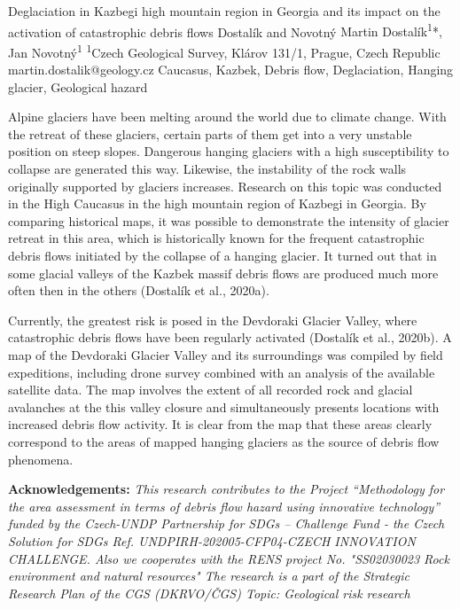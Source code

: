 \abstract
{Deglaciation in Kazbegi high mountain region in Georgia and its impact on the activation of catastrophic debris flows} 
{Dostalík and Novotný} 
{Martin Dostalík\textsuperscript{1}*, Jan Novotný\textsuperscript{1}} 
{\TLtag} 
{
\textsuperscript{1}Czech Geological Survey, Klárov 131/1, Prague, Czech Republic
}
{martin.dostalik@geology.cz}  %
{Caucasus, Kazbek, Debris flow, Deglaciation, Hanging glacier, Geological hazard}
{Alpine glaciers have been melting around the world due to climate change. With the retreat of these glaciers, certain parts of them get into a very unstable position on steep slopes. Dangerous hanging glaciers with a high susceptibility to collapse are generated this way. Likewise, the instability of the rock walls originally supported by glaciers increases. 
Research on this topic was conducted in the High Caucasus in the high mountain region of Kazbegi in Georgia. By comparing historical maps, it was possible to demonstrate the intensity of glacier retreat in this area, which is historically known for the frequent catastrophic debris flows initiated by the collapse of a hanging glacier. It turned out that in some glacial valleys of the Kazbek massif debris flows are produced much more often then in the others (Dostalík et al., 2020a). 

Currently, the greatest risk is posed in the Devdoraki Glacier Valley, where catastrophic debris flows have been regularly activated (Dostalík et al., 2020b). A map of the Devdoraki Glacier Valley and its surroundings was compiled by field expeditions, including drone survey combined with an analysis of the available satellite data. The map involves the extent of all recorded rock and glacial avalanches at the this valley closure and simultaneously presents locations with increased debris flow activity. It is clear from the map that these areas clearly correspond to the areas of mapped hanging glaciers as the source of debris flow phenomena.

\vspace{0.5em}
\noindent
\textbf{Acknowledgements:}
\textit{This research contributes to the Project “Methodology for the area assessment in terms of debris flow hazard using innovative technology” funded by the Czech-UNDP Partnership for SDGs – Challenge Fund - the Czech Solution for SDGs Ref. UNDPIRH-202005-CFP04-CZECH INNOVATION CHALLENGE. 
	Also we cooperates with the RENS project No. "SS02030023 Rock environment and natural resources" 
	The research is a part of the Strategic Research Plan of the CGS (DKRVO/ČGS) Topic: Geological risk research}
}
